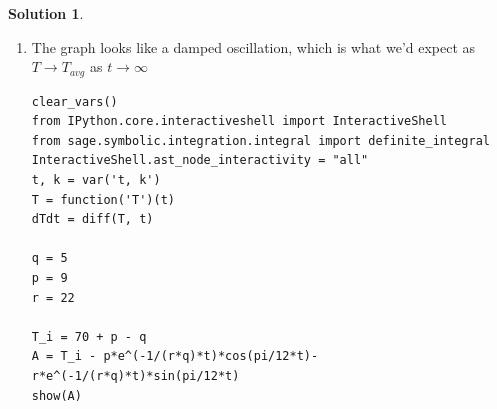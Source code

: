 \documentclass[10pt]{article}
\makeatletter
\theoremstyle{definition}
\newtheorem{soln}{Solution}
\newcommand{\boxspacing}{\kern\kvtcb@left@rule\kern\kvtcb@boxsep}
\newcommand{\prompt}[4]{
    \ttfamily\llap{{\color{#2}[#3]:\hspace{3pt}#4}}\vspace{-\baselineskip}
}
\makeatother
\begin{document}
\begin{soln}
\begin{enumerate}[label=(\alph*)]
\begin{tcolorbox}[breakable, size=fbox, boxrule=.5pt, pad at break*=1mm, opacityfill=0]
          \end{tcolorbox}
          \newpage      
    \item The graph looks like a damped oscillation, which is what we'd expect as $T\to T_{avg}$ as $t\to\infty$
          \begin{tcolorbox}[breakable, size=fbox, boxrule=1pt, pad at break*=1mm,colback=cellbackground, colframe=cellborder]
            \prompt{In}{incolor}{1}{\boxspacing}
            \begin{verbatim}
clear_vars()
from IPython.core.interactiveshell import InteractiveShell
from sage.symbolic.integration.integral import definite_integral
InteractiveShell.ast_node_interactivity = "all"
t, k = var('t, k')
T = function('T')(t)
dTdt = diff(T, t)

q = 5
p = 9
r = 22

T_i = 70 + p - q
A = T_i - p*e^(-1/(r*q)*t)*cos(pi/12*t)-r*e^(-1/(r*q)*t)*sin(pi/12*t)
show(A)


\end{verbatim}
\end{tcolorbox}
\end{enumerate}
\end{soln}
\end{document}
